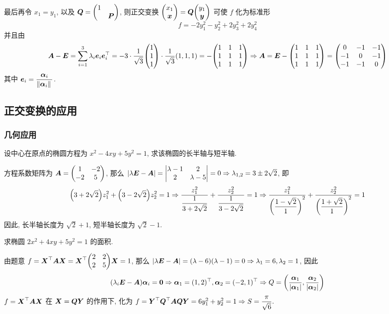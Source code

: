 \begin{solution}
    最后再令 $x_1=y_1$, 以及 $\vb*{Q}=\mqty(1\\&\vb*{P})$, 则正交变换 $\mqty(x_1\\\vb*{x})=\vb*{Q}\mqty(y_1\\\vb*{y})$ 可使 $f$ 化为标准形 $$f=-2y_1^2-y_2^2+2y_3^2+2y_4^2$$ 并且由
    $$\vb*{A}-\vb*{E}=\sum_{i=1}^{3}\lambda_i\vb*{e}_i\vb*{e}_i^\top=-3\cdot\dfrac{1}{\sqrt{3}}\mqty(1\\1\\1)\cdot\dfrac{1}{\sqrt{3}}(1,1,1)=-\mqty(1&1&1\\1&1&1\\1&1&1)\Rightarrow \vb*{A}=\vb*{E}-\mqty(1&1&1\\1&1&1\\1&1&1)=\mqty(0&-1&-1\\-1&0&-1\\-1&-1&0)$$
    其中 $\vb*{e}_i=\dfrac{\vb*{\alpha}_i}{\norm*{\vb*{\alpha}_i}}$.
\end{solution}

\subsection{正交变换的应用}

\subsubsection{几何应用}

\begin{example}
    设中心在原点的椭圆方程为 $x^2-4xy+5y^2=1$, 求该椭圆的长半轴与短半轴.
\end{example}
\begin{solution}
    方程系数矩阵为 $\vb*{A}=\mqty(1&-2\\-2&5)$, 那么 $|\lambda\vb*{E}-\vb*{A}|=\mqty|\lambda-1 & 2\\2&\lambda-5|=0\Rightarrow \lambda_{1,2}=3\pm 2\sqrt{2}$, 即
    $$\qty(3+2\sqrt{2})z_1^2+\qty(3-2\sqrt{2})z_2^2=1\Rightarrow \dfrac{z_1^2}{\dfrac{1}{3+2\sqrt{2}}}+\dfrac{z_2^2}{\dfrac{1}{3-2\sqrt{2}}}=1\Rightarrow \dfrac{z_1^2}{\qty(\dfrac{1-\sqrt{2}}{1})^2}+\dfrac{z_2^2}{\qty(\dfrac{1+\sqrt{2}}{1})^2}=1$$
    因此, 长半轴长度为 $\sqrt{2}+1$, 短半轴长度为 $\sqrt{2}-1.$
\end{solution}

\begin{example}
    求椭圆 $2x^2+4xy+5y^2=1$ 的面积.
\end{example}
\begin{solution}
    由题意 $f=\vb*{X}^\top\vb*{AX}=\vb*{X}^\top\mqty(2&2\\2&5)\vb*{X}=1$, 那么 $|\lambda \vb*{E}-\vb*{A}|=(\lambda-6)(\lambda-1)=0\Rightarrow \lambda_1=6,\lambda_2=1$, 因此
    $$(\lambda_i\vb*{E}-\vb*{A})\vb*{\alpha}_i=\vb*{0}\Rightarrow \vb*{\alpha}_1=(1,2)^\top,\vb*{\alpha}_2=(-2,1)^\top\Rightarrow Q=\qty(\dfrac{\vb*{\alpha}_1}{|\vb*{\alpha}_1|},\dfrac{\vb*{\alpha}_2}{|\vb*{\alpha}_2|})$$
    $f=\vb*{X}^\top\vb*{AX}$ 在 $\vb*{X}=\vb*{QY}$ 的作用下, 化为 $f=\vb*{Y}^\top\vb*{Q}^\top\vb*{AQY}=6y_1^2+y_2^2=1\Rightarrow S=\dfrac{\pi}{\sqrt{6}}.$
\end{solution}

